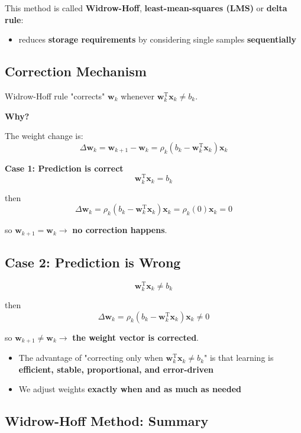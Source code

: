 \documentclass[11pt,a4paper]{article}
\theoremstyle{definition}
\theoremstyle{plain}
\theoremstyle{remark}
\begin{document}
This method is called \textbf{Widrow-Hoff}, \textbf{least-mean-squares (LMS)} or \textbf{delta rule}:
\begin{itemize}
    \item reduces \textbf{storage requirements} by considering single samples \textbf{sequentially}
\end{itemize}

\subsection{Correction Mechanism}

Widrow-Hoff rule "corrects" $\mathbf{w}_k$ whenever $\mathbf{w}_k^{\mathrm{T}} \mathbf{x}_k \neq b_k$.

\textbf{Why?}

The weight change is:
\[
\Delta \mathbf{w}_k = \mathbf{w}_{k+1} - \mathbf{w}_k = \rho_k (b_k - \mathbf{w}_k^{\mathrm{T}} \mathbf{x}_k) \mathbf{x}_k
\]

\textbf{Case 1: Prediction is correct}
\[
\mathbf{w}_k^{\mathrm{T}} \mathbf{x}_k = b_k
\]

then
\[
\Delta \mathbf{w}_k = \rho_k (b_k - \mathbf{w}_k^{\mathrm{T}} \mathbf{x}_k) \mathbf{x}_k = \rho_k (0) \mathbf{x}_k = 0
\]

so $\mathbf{w}_{k+1} = \mathbf{w}_k \rightarrow$ \textbf{no correction happens}.

\subsection{Case 2: Prediction is Wrong}

\[
\mathbf{w}_k^{\mathrm{T}} \mathbf{x}_k \neq b_k
\]

then
\[
\Delta \mathbf{w}_k = \rho_k (b_k - \mathbf{w}_k^{\mathrm{T}} \mathbf{x}_k) \mathbf{x}_k \neq 0
\]

so $\mathbf{w}_{k+1} \neq \mathbf{w}_k \rightarrow$ \textbf{the weight vector is corrected}.

\begin{itemize}
    \item The advantage of "correcting only when $\mathbf{w}_k^{\mathrm{T}} \mathbf{x}_k \neq b_k$" is that learning is \textbf{efficient, stable, proportional, and error-driven}
    
    \item We adjust weights \textbf{exactly when and as much as needed}
\end{itemize}

\subsection{Widrow-Hoff Method: Summary}
\end{document}
